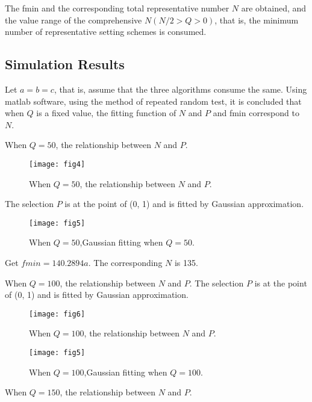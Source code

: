 \documentclass{ieeeaccess}
\begin{document}
The fmin and the corresponding total representative number $N$ are obtained, and the value range of the comprehensive $N(N/2>Q>0)$, that is, the minimum number of representative setting schemes is consumed.

\subsection{Simulation Results}
Let $a=b=c$, that is, assume that the three algorithms consume the same. Using matlab software, using the method of repeated random test, it is concluded that when $Q$ is a fixed value, the fitting function of $N$ and $P$ and fmin correspond to $N$.

When $Q=50$, the relationship between $N$ and $P$.
\begin{figure}[htbp]
\begin{center}
\texttt{[image: fig4]}
\caption{When $Q=50$, the relationship between $N$ and $P$.}
\label{f}
\end{center}
\end{figure}


The selection $P$ is at the point of (0, 1) and is fitted by Gaussian approximation.
\begin{figure}[htbp]
\begin{center}
\texttt{[image: fig5]}
\caption{When $Q=50$,Gaussian fitting when $Q=50$.}
\label{f}
\end{center}
\end{figure}

Get $fmin=140.2894a$. The corresponding $N$ is 135.

When $Q=100$, the relationship between $N$ and $P$.
The selection $P$ is at the point of (0, 1) and is fitted by Gaussian approximation.
\begin{figure}[htbp]
\begin{center}
\texttt{[image: fig6]}
\caption{When $Q=100$, the relationship between $N$ and $P$.}
\label{f}
\end{center}
\end{figure}

\begin{figure}[htbp]
\begin{center}
\texttt{[image: fig5]}
\caption{When $Q=100$,Gaussian fitting when $Q=100$.}
\label{f}
\end{center}
\end{figure}
When $Q=150$, the relationship between $N$ and $P$.
\end{document}
